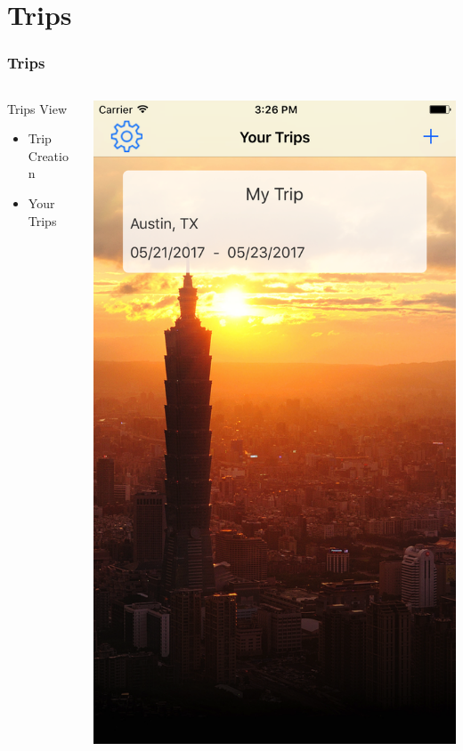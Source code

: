 \documentclass{beamer}
\begin{document}
\section{Trips}
\begin{frame}
\frametitle{Trips}
\begin{columns}
    \begin{column}{0.3\textwidth}
        Trips View
        \begin{itemize}
            \item Trip Creation
            \item Your Trips
        \end{itemize}
    \end{column}
    \begin{column}{0.3\textwidth}  %
        \begin{center}
            \includegraphics[scale=0.08]{trips}

\end{center}
\end{column}
\end{columns}
\end{frame}
\end{document}
